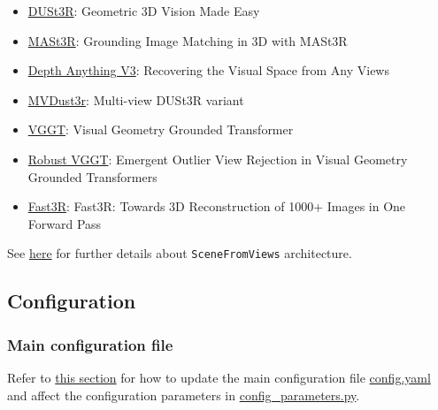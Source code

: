\documentclass{article}
\providecommand{\tightlist}{%
  \setlength{\itemsep}{0pt}\setlength{\parskip}{0pt}}
\begin{document}
\begin{itemize}
\tightlist
\item
  \href{https://arxiv.org/abs/2312.14132}{DUSt3R}\cite{wang2023dust3r}: Geometric 3D Vision
  Made Easy
\item
  \href{https://arxiv.org/abs/2406.09756}{MASt3R}\cite{master}: Grounding Image
  Matching in 3D with MASt3R 
\item
  \href{https://arxiv.org/abs/2511.10647}{Depth Anything V3}\cite{depthanything3}: Recovering
  the Visual Space from Any Views
\item
  \href{https://github.com/naver/mvdust3r}{MVDust3r}\cite{mvduster}: Multi-view DUSt3R
  variant
\item
  \href{https://github.com/facebookresearch/vggt}{VGGT}\cite{wang2025vggt}: Visual Geometry
  Grounded Transformer
\item
  \href{https://github.com/cvlab-kaist/RobustVGGT.git}{Robust VGGT}\cite{vggt_robust}:
  Emergent Outlier View Rejection in Visual Geometry Grounded
  Transformers
\item
  \href{https://arxiv.org/abs/2501.13928}{Fast3R}\cite{yang2025fast3r}: Fast3R: Towards 3D Reconstruction of 1000+ Images in One Forward Pass
\end{itemize}

See \href{https://github.com/luigifreda/pyslam/blob/master/pyslam/scene_from_views/README.md}{here} for further details about
\texttt{SceneFromViews} architecture.


\hypertarget{configuration}{%
\subsection{Configuration}\label{configuration}}

\hypertarget{main-configuration-file}{%
\subsubsection{Main configuration file}\label{main-configuration-file}}

Refer to
\protect\hyperlink{selecting-a-dataset-and-different-configuration-parameters}{this
section} for how to update the main configuration file
\href{https://github.com/luigifreda/pyslam/blob/master/config.yaml}{config.yaml} and affect the configuration
parameters in \href{https://github.com/luigifreda/pyslam/blob/master/pyslam/config_parameters.py}{config\_parameters.py}.
\end{document}
